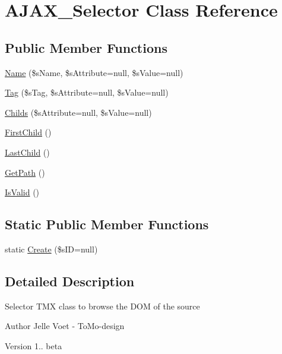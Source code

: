 \hypertarget{class_a_j_a_x___selector}{\section{A\-J\-A\-X\-\_\-\-Selector Class Reference}
\label{class_a_j_a_x___selector}
}
\subsection*{Public Member Functions}
\begin{DoxyCompactItemize}
\item 
\hyperlink{class_a_j_a_x___selector_a5b1af0ac2d1ad898ec4a845b7874ed97}{Name} (\$s\-Name, \$s\-Attribute=null, \$s\-Value=null)
\item 
\hyperlink{class_a_j_a_x___selector_ab8259e16335cbd7db818073845982dd5}{Tag} (\$s\-Tag, \$s\-Attribute=null, \$s\-Value=null)
\item 
\hyperlink{class_a_j_a_x___selector_a35540abd81d6ad25022599531890770c}{Childs} (\$s\-Attribute=null, \$s\-Value=null)
\item 
\hyperlink{class_a_j_a_x___selector_a3e1f0f6f7116bebfe0d5153ded42820e}{First\-Child} ()
\item 
\hyperlink{class_a_j_a_x___selector_aaafef1531c800b05118b6d4466aa827f}{Last\-Child} ()
\item 
\hyperlink{class_a_j_a_x___selector_afd0c18f7697ae67e3e7ada01c89b84a1}{Get\-Path} ()
\item 
\hyperlink{class_a_j_a_x___selector_a26e086617bbc3ffa1dd4d4b889523345}{Is\-Valid} ()
\end{DoxyCompactItemize}
\subsection*{Static Public Member Functions}
\begin{DoxyCompactItemize}
\item 
static \hyperlink{class_a_j_a_x___selector_adc1bdf2f113bca7cf716793855c63b4c}{Create} (\$s\-I\-D=null)
\end{DoxyCompactItemize}


\subsection{Detailed Description}
Selector T\-M\-X class to browse the D\-O\-M of the source

\begin{DoxyAuthor}{Author}
Jelle Voet -\/ To\-Mo-\/design 
\end{DoxyAuthor}
\begin{DoxyVersion}{Version}
1.. beta 
\end{DoxyVersion}


